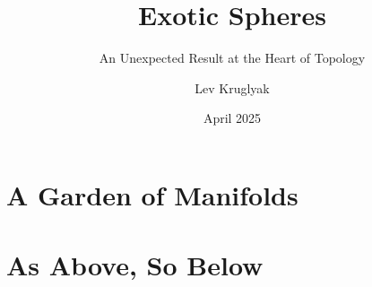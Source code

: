 \documentclass{lkx_thesis}
\title{Exotic Spheres}
\subtitle{An Unexpected Result at the Heart of Topology}
\author{Lev Kruglyak}
\date{April 2025}
\begin{document}


\lkxtoc



\part{A Garden of Manifolds}





\part{As Above, So Below}






\lkxrefs
\lkxindex
\end{document}
